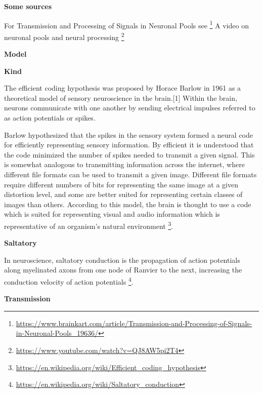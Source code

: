 \documentclass{book}
\providecommand{\ProjectDeepHeading}[2]{%
    \par\medskip\noindent\textbf{#2}\par\smallskip
}
\providecommand{\seeherefooter}[1]{\footnote{\url{#1}}}
\begin{document}
    
    \ProjectDeepHeading{8}{Some sources}
        For Transmission and Processing of Signals in Neuronal Pools see
        \seeherefooter{https://www.brainkart.com/article/Transmission-and-Processing-of-Signals-in-Neuronal-Pools_19636/}
        A video on neuronal pools and neural processing
        \seeherefooter{https://www.youtube.com/watch?v=QJ8AW5pi2T4}

\ProjectDeepHeading{4}{Model}

\ProjectDeepHeading{5}{Kind}


The efficient coding hypothesis was proposed by Horace Barlow in 1961 as a theoretical model of sensory neuroscience in the brain.[1] Within the brain, neurons communicate with one another by sending electrical impulses referred to as action potentials or spikes.
    
    Barlow hypothesized that the spikes in the sensory system formed a neural code for efficiently representing sensory information. By efficient it is understood that the code minimized the number of spikes needed to transmit a given signal. This is somewhat analogous to transmitting information across the internet, where different file formats can be used to transmit a given image. Different file formats require different numbers of bits for representing the same image at a given distortion level, and some are better suited for representing certain classes of images than others. According to this model, the brain is thought to use a code which is suited for representing visual and audio information which is representative of an organism's natural environment \seeherefooter{https://en.wikipedia.org/wiki/Efficient_coding_hypothesis}.
%    
%

\ProjectDeepHeading{3}{Saltatory}


In neuroscience, saltatory conduction is the propagation of action potentials along myelinated axons from one node of Ranvier to the next, increasing the conduction velocity of action potentials \seeherefooter{https://en.wikipedia.org/wiki/Saltatory_conduction}.

\ProjectDeepHeading{3}{Transmission}

\end{document}
